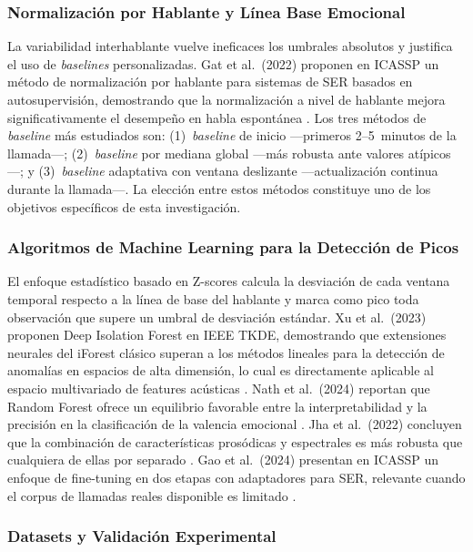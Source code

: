 \subsubsection{Normalización por Hablante y Línea Base Emocional}

La variabilidad interhablante vuelve ineficaces los umbrales absolutos y justifica el
uso de \textit{baselines} personalizadas. Gat et al.\ (2022) proponen en ICASSP un
método de normalización por hablante para sistemas de SER basados en
autosupervisión, demostrando que la normalización a nivel de hablante mejora
significativamente el desempeño en habla espontánea \cite{gat2022}. Los tres métodos
de \textit{baseline} más estudiados son: (1)~\textit{baseline} de inicio ---primeros
2--5~minutos de la llamada---; (2)~\textit{baseline} por mediana global ---más robusta
ante valores atípicos---; y (3)~\textit{baseline} adaptativa con ventana deslizante
---actualización continua durante la llamada---. La elección entre estos métodos
constituye uno de los objetivos específicos de esta investigación.

\subsubsection{Algoritmos de Machine Learning para la Detección de Picos}

El enfoque estadístico basado en Z-scores calcula la desviación de cada ventana
temporal respecto a la línea de base del hablante y marca como pico toda observación
que supere un umbral de desviación estándar. Xu et al.\ (2023) proponen Deep Isolation
Forest en IEEE TKDE, demostrando que extensiones neurales del iForest clásico superan
a los métodos lineales para la detección de anomalías en espacios de alta dimensión,
lo cual es directamente aplicable al espacio multivariado de features acústicas
\cite{xu2023}. Nath et al.\ (2024) reportan que Random Forest ofrece un equilibrio
favorable entre la interpretabilidad y la precisión en la clasificación de la valencia
emocional \cite{nath2024}. Jha et al.\ (2022) concluyen que la combinación de
características prosódicas y espectrales es más robusta que cualquiera de ellas por
separado \cite{jha2022}. Gao et al.\ (2024) presentan en ICASSP un enfoque de
fine-tuning en dos etapas con adaptadores para SER, relevante cuando el corpus de
llamadas reales disponible es limitado \cite{gao2024}.

\subsubsection{Datasets y Validación Experimental}

